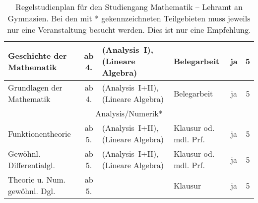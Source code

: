\begin{table}[tbp]
\begin{small}
\begin{tabularx}{\textwidth}{|@{~}X@{~}|@{~}c@{~}|@{~}X@{~}|@{~}X@{~}|@{~}c@{~}|@{~}c@{~}|}
			Geschichte der Mathe\-matik&ab 4.&(Analysis~I), (Lineare Algebra)&Beleg\-arbeit&ja&5\\\hline
			Grund\-lagen der Mathe\-matik&ab 4.&(Analysis~I+II), (Lineare Algebra)&Beleg\-arbeit&ja&5\\\hline\hline
			\multicolumn{6}{|c|}{Analysis/Numerik*}\\\hline
			Funktionen\-theorie&ab 5.&(Analysis~I+II), (Lineare Algebra)&Klausur od. mdl. Prf.&ja&5\\\hline
			Gewöhnl. Differentialgl.&ab 5.&(Analysis~I+II), (Lineare Algebra)&Klausur od. mdl. Prf.&ja&5\\\hline
			Theorie u. Num. gewöhnl. Dgl.&ab 5.&&Klausur&ja&5\\\hline
		\end{tabularx}
	\end{small}
	\caption{\label{plan-lag}Regelstudienplan für den Studiengang
		Mathematik -- Lehramt an Gymnasien. Bei den mit * gekennzeichneten
		Teilgebieten muss jeweils nur eine Veranstaltung besucht werden. Dies
		ist nur eine Empfehlung.}
\end{table}

\label{studiengang_las}

